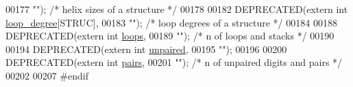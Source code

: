 \begin{DoxyCode}
00177            \textcolor{stringliteral}{""});        \textcolor{comment}{/* helix sizes of a structure */}
00178 
00182 DEPRECATED(\textcolor{keyword}{extern} \textcolor{keywordtype}{int} \hyperlink{group__struct__utils__deprecated_ga0518a287aa4a870508cea819029778ab}{loop\_degree}[STRUC],
00183            \textcolor{stringliteral}{""});       \textcolor{comment}{/* loop degrees of a structure */}
00184 
00188 DEPRECATED(\textcolor{keyword}{extern} \textcolor{keywordtype}{int} \hyperlink{group__struct__utils__deprecated_ga439fcb9f8d4f9f4d2227fde5fbfecb30}{loops},
00189            \textcolor{stringliteral}{""});                    \textcolor{comment}{/* n of loops and stacks */}
00190 
00194 DEPRECATED(\textcolor{keyword}{extern} \textcolor{keywordtype}{int} \hyperlink{group__struct__utils__deprecated_gadd2f952597e02d66e1116a9d11d252d6}{unpaired},
00195            \textcolor{stringliteral}{""});
00196 
00200 DEPRECATED(\textcolor{keyword}{extern} \textcolor{keywordtype}{int} \hyperlink{group__struct__utils__deprecated_ga6341cbb704924824e0236c1dce791032}{pairs},
00201            \textcolor{stringliteral}{""});          \textcolor{comment}{/* n of unpaired digits and pairs */}
00202 
00207 \textcolor{preprocessor}{#endif}
\end{DoxyCode}
